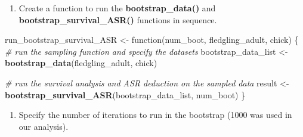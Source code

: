 \documentclass[]{article}
\newenvironment{Shaded}{\begin{snugshade}}{\end{snugshade}}
\newcommand{\KeywordTok}[1]{\textcolor[rgb]{0.13,0.29,0.53}{\textbf{{#1}}}}
\newcommand{\DataTypeTok}[1]{\textcolor[rgb]{0.13,0.29,0.53}{{#1}}}
\newcommand{\StringTok}[1]{\textcolor[rgb]{0.31,0.60,0.02}{{#1}}}
\newcommand{\CommentTok}[1]{\textcolor[rgb]{0.56,0.35,0.01}{\textit{{#1}}}}
\newcommand{\NormalTok}[1]{{#1}}
\providecommand{\tightlist}{%
  \setlength{\itemsep}{0pt}\setlength{\parskip}{0pt}}
\begin{document}
\begin{Shaded}
\end{Shaded}

\begin{enumerate}
\def\labelenumi{\Alph{enumi})}
\setcounter{enumi}{2}
\tightlist
\item
  Create a function to run the \textbf{bootstrap\_data()} and
  \textbf{bootstrap\_survival\_ASR()} functions in sequence.
\end{enumerate}

\begin{Shaded}
\begin{Highlighting}[]
\NormalTok{run_bootstrap_survival_ASR <-}\StringTok{ }\NormalTok{function(num_boot, fledgling_adult, chick)}
  \NormalTok{\{}
  \CommentTok{# run the sampling function and specify the datasets}
  \NormalTok{bootstrap_data_list <-}\StringTok{ }\KeywordTok{bootstrap_data}\NormalTok{(fledgling_adult, chick)}
  
  \CommentTok{# run the survival analysis and ASR deduction on the sampled data}
  \NormalTok{result <-}\StringTok{ }\KeywordTok{bootstrap_survival_ASR}\NormalTok{(bootstrap_data_list, num_boot)}
\NormalTok{\}}
\end{Highlighting}
\end{Shaded}

\begin{enumerate}
\def\labelenumi{\Alph{enumi})}
\setcounter{enumi}{3}
\tightlist
\item
  Specify the number of iterations to run in the bootstrap (1000 was
  used in our analysis).
\end{enumerate}
\end{document}
